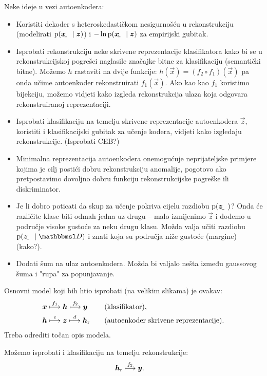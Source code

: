 \documentclass[twocolumn]{article}
\begin{document}
Neke ideje u vezi autoenkodera:
\begin{itemize}
    \item Koristiti dekoder s heteroskedastičkom \citep{Kendall:2017:WUNBDLCV} nesigurnošću u rekonstrukciju (modelirati $\p(\rvec x\mid \vec z)$) i $-\ln\p(\rvec x\mid \vec z)$ za empirijski gubitak.
    \item Isprobati rekonstrukciju neke skrivene reprezentacije klasifikatora kako bi se u rekonstrukcijskoj pogrešci naglasile značajke bitne za klasifikaciju (semantički bitne). Možemo $h$ rastaviti na dvije funkcije: $h(\vec x) = (f_2\circ f_1)(\vec x)$ pa onda učime autoenkoder rekonstruirati $f_1(\vec x)$. Ako kao kao $f_1$ koristimo bijekciju, možemo vidjeti kako izgleda rekonstrukcija ulaza koja odgovara rekonstruiranoj reprezentaciji.
    \item Isprobati klasifikaciju na temelju skrivene reprezentacije autoenkodera $\vec z$, koristiti i klasifikacijski gubitak za učenje kodera, vidjeti kako izgledaju rekonstrukcije. (Isprobati CEB?)
    \item Minimalna reprezentacija autoenkodera onemogućuje neprijateljske primjere kojima je cilj postići dobru rekonstrukciju anomalije, pogotovo ako pretpostavimo dovoljno dobru funkciju rekonstrukcijske pogreške ili diskriminator.
    \item Je li dobro poticati da skup za učenje pokriva cijelu razdiobu $\p(\rvec z)$? Onda će različite klase biti odmah jedna uz drugu -- malo izmijenimo $\vec z$ i dođemo u područje visoke gustoće za neku drugu klasu. Možda valja učiti razdiobu $\p(\rvec z\mid \set D)$ i znati koja su područja niže gustoće (margine) (kako?).
    \item Dodati šum na ulaz autoenkodera. Možda bi valjalo nešta između gaussovog šuma i "rupa" za popunjavanje.
\end{itemize}

Osnovni model koji bih htio isprobati (na velikim slikama) je ovakav:
\begin{alignat}{3}
    &\vec x \overset{f_1}{\longmapsto} \vec h \overset{f_2}{\longmapsto} \vec y 
    \quad&&\text{(klasifikator)} \text, \\
    &\vec h \overset{e}{\longmapsto} \vec z \overset{d}{\longmapsto} \vec h_\text{r}
    \quad&&\text{(autoenkoder skrivene reprezentacije)} \text.
\end{alignat}
Treba odrediti točan opis modela.

Možemo isprobati i klasifikaciju na temelju rekonstrukcije:
\begin{align}
    &\vec h_\text{r} \overset{f_2}{\longmapsto} \vec y\text.
\end{align}
\end{document}

